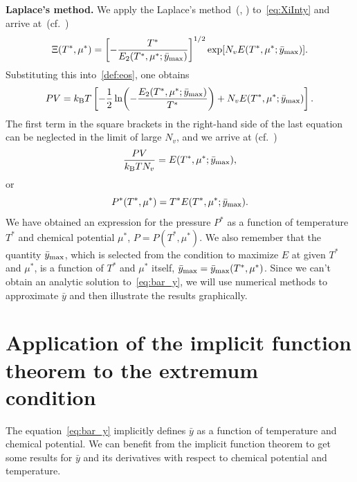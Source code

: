 \documentclass[12pt]{article}
\numberwithin{equation}{section}
\begin{document}
	\textbf{Laplace's method.} We apply the Laplace's method~(\cite[(1.21)]{Fedoryuk89}, \cite[(6.4.19c)]{BenderOrszag99}) to~\eqref{eq:XiInty} and arrive at~(cf.~\cite[(19)]{KD22})
	\begin{equation}
		\label{laplace1}
		\Xi(T^*,\mu^*) = \left[-\frac{T^*}{E_2(T^*,\mu^*;\bar{y}_{\rm max})}\right]^{1/2} \exp[N_v E(T^*,\mu^*;\bar{y}_{\rm max})].
	\end{equation}
	Substituting this into~\eqref{def:eos}, one obtains
	\begin{equation}
		P V = k_{\rm B}T \left[-\frac{1}{2} \ln(-\frac{E_2(T^*,\mu^*;\bar{y}_{\rm max})}{T^*}) + N_v E(T^*,\mu^*;\bar{y}_{\rm max})\right].
	\end{equation}
	The first term in the square brackets in the right-hand side of the last equation can be neglected in the limit of large $N_v$, and we arrive at (cf.~\cite[(2.27)]{KKD20})
	\begin{equation}
		\frac{P V}{k_{\rm B}T N_v} = E(T^*,\mu^*;\bar{y}_{\rm max}),
	\end{equation}
	or
	\begin{equation}
		\label{eos:reduced}
		P^*(T^*,\mu^*) = T^* E(T^*,\mu^*;\bar{y}_{\rm max}).
	\end{equation}
	We have obtained an expression for the pressure $P^*$ as a function of temperature $T^*$ and chemical potential $\mu^*$, $P = P(T^*, \mu^*)$. We also remember that the quantity $\bar{y}_{\rm max}$, which is selected from the condition to maximize $E$ at given $T^*$ and $\mu^*$, is a function of $T^*$ and $\mu^*$ itself, $\bar{y}_{\rm max} = \bar{y}_{\rm max}(T^*,\mu^*)$. Since we can't obtain an analytic solution to~\eqref{eq:bar_y}, we will use numerical methods to approximate $\bar{y}$ and then illustrate the results graphically.

	
	\pagebreak
	\section{Application of the implicit function theorem to the extremum condition}
	The equation~\eqref{eq:bar_y} implicitly defines $\bar{y}$ as a function of temperature and chemical potential. We can benefit from the implicit function theorem to get some results for $\bar{y}$ and its derivatives with respect to chemical potential and temperature.
	
\end{document}
